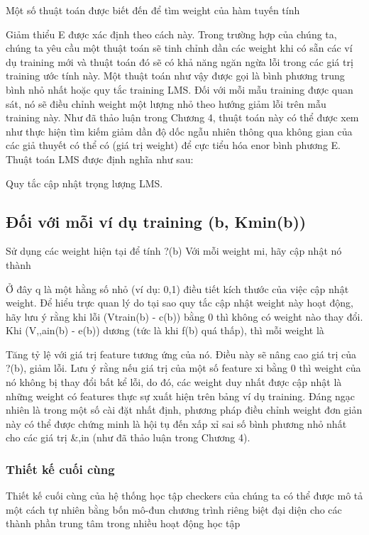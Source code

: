 Một số thuật toán được biết đến để tìm weight của hàm tuyến tính

Giảm thiểu E được xác định theo cách này. Trong trường hợp của chúng ta, chúng ta yêu cầu một thuật toán sẽ tinh chỉnh dần các weight khi có sẵn các ví dụ training mới và thuật toán đó sẽ có khả năng ngăn ngừa lỗi trong các giá trị training ước tính này. Một thuật toán như vậy được gọi là bình phương trung bình nhỏ nhất hoặc quy tắc training LMS. Đối với mỗi mẫu training được quan sát, nó sẽ điều chỉnh weight một lượng nhỏ theo hướng giảm lỗi trên mẫu training này. Như đã thảo luận trong Chương 4, thuật toán này có thể được xem như thực hiện tìm kiếm giảm dần độ dốc ngẫu nhiên thông qua không gian của các giả thuyết có thể có (giá trị weight) để cực tiểu hóa enor bình phương E. Thuật toán LMS được định nghĩa như sau:

Quy tắc cập nhật trọng lượng LMS.

\subsection{Đối với mỗi ví dụ training (b, Kmin(b))}

Sử dụng các weight hiện tại để tính ?(b) Với mỗi weight mi, hãy cập nhật nó thành

Ở đây q là một hằng số nhỏ (ví dụ: 0,1) điều tiết kích thước của việc cập nhật weight. Để hiểu trực quan lý do tại sao quy tắc cập nhật weight này hoạt động, hãy lưu ý rằng khi lỗi (Vtrain(b) - c(b)) bằng 0 thì không có weight nào thay đổi. Khi (V,,ain(b) - e(b)) dương (tức là khi f(b) quá thấp), thì mỗi weight là

Tăng tỷ lệ với giá trị feature tương ứng của nó. Điều này sẽ nâng cao giá trị của ?(b), giảm lỗi. Lưu ý rằng nếu giá trị của một số feature xi bằng 0 thì weight của nó không bị thay đổi bất kể lỗi, do đó, các weight duy nhất được cập nhật là những weight có features thực sự xuất hiện trên bảng ví dụ training. Đáng ngạc nhiên là trong một số cài đặt nhất định, phương pháp điều chỉnh weight đơn giản này có thể được chứng minh là hội tụ đến xấp xỉ sai số bình phương nhỏ nhất cho các giá trị \&,in (như đã thảo luận trong Chương 4).

\subsubsection{Thiết kế cuối cùng}

Thiết kế cuối cùng của hệ thống học tập checkers của chúng ta có thể được mô tả một cách tự nhiên bằng bốn mô-đun chương trình riêng biệt đại diện cho các thành phần trung tâm trong nhiều hoạt động học tập

